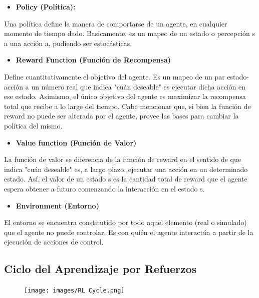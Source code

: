 \documentclass[11pt]{article}
\providecommand{\tightlist}{%
      \setlength{\itemsep}{0pt}\setlength{\parskip}{0pt}}
\begin{document}
\begin{itemize}
\tightlist
\item
  \textbf{Policy (Política): }
\end{itemize}

Una política define la manera de comportarse de un agente, en cualquier
momento de tiempo dado. Basicamente, es un mapeo de un estado o
percepción s a una acción a, pudiendo ser estocásticas.

\begin{itemize}
\tightlist
\item
  \textbf{Reward Function (Función de Recompensa)}
\end{itemize}

Define cuantitativamente el objetivo del agente. Es un mapeo de un par
estado-acción a un número real que indica "cuán deseable" es ejecutar
dicha acción en ese estado. Asimismo, el único objetivo del agente es
maximizar la recompensa total que recibe a lo large del tiempo. Cabe
mencionar que, si bien la función de reward no puede ser alterada por el
agente, provee las bases para cambiar la política del mismo.

\begin{itemize}
\tightlist
\item
  \textbf{Value function (Función de Valor)}
\end{itemize}

La función de valor se diferencia de la función de reward en el sentido
de que indica "cuán deseable" es, a largo plazo, ejecutar una acción en
un determinado estado. Así, el valor de un estado s es la cantidad total
de reward que el agente espera obtener a futuro comenzando la
interacción en el estado s.

\begin{itemize}
\tightlist
\item
  \textbf{Environment (Entorno)}
\end{itemize}

El entorno se encuentra constitutido por todo aquel elemento (real o
simulado) que el agente no puede controlar. Es con quién el agente
interactúa a partir de la ejecución de acciones de control.

\subsection{Ciclo del Aprendizaje por
Refuerzos}\label{ciclo-del-aprendizaje-por-refuerzos}

\begin{figure}
\centering
\texttt{[image: images/RL Cycle.png]}
\caption{}
\end{figure}
\end{document}
